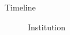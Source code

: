 \begin{frame}{Timeline}

\begin{figure}[t!] \centering
        
        \caption{\textcolor[RGB]{32,74,135}{Institution}}
\end{figure}

\end{frame}
